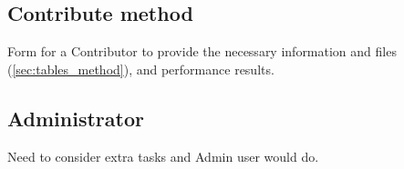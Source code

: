 \subsection{Contribute method}

Form for a Contributor to provide the necessary information and files (\cref{sec:tables_method}), and performance results.

\subsection{Administrator}

Need to consider extra tasks and Admin user would do.
